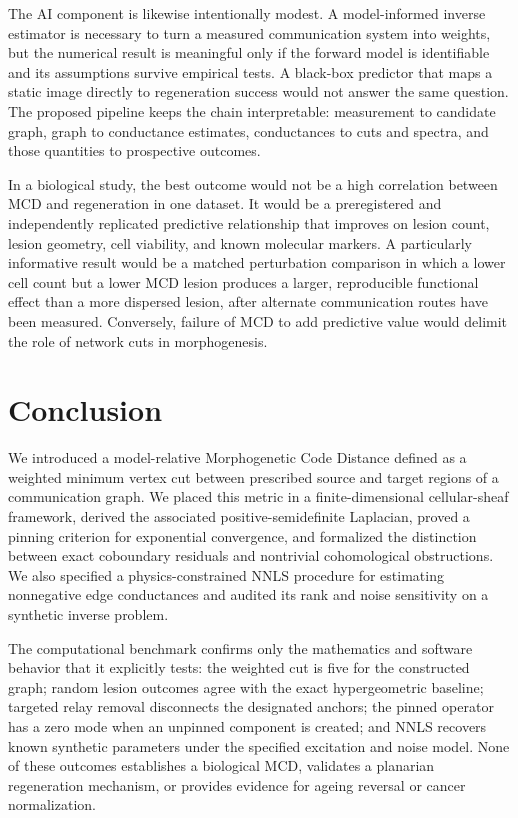 \documentclass[12pt,a4paper]{article}
\begin{document}
The AI component is likewise intentionally modest. A model-informed inverse estimator is necessary to turn a measured communication system into weights, but the numerical result is meaningful only if the forward model is identifiable and its assumptions survive empirical tests. A black-box predictor that maps a static image directly to regeneration success would not answer the same question. The proposed pipeline keeps the chain interpretable: measurement to candidate graph, graph to conductance estimates, conductances to cuts and spectra, and those quantities to prospective outcomes.

In a biological study, the best outcome would not be a high correlation between MCD and regeneration in one dataset. It would be a preregistered and independently replicated predictive relationship that improves on lesion count, lesion geometry, cell viability, and known molecular markers. A particularly informative result would be a matched perturbation comparison in which a lower cell count but a lower MCD lesion produces a larger, reproducible functional effect than a more dispersed lesion, after alternate communication routes have been measured. Conversely, failure of MCD to add predictive value would delimit the role of network cuts in morphogenesis.

\section{Conclusion}
We introduced a model-relative Morphogenetic Code Distance defined as a weighted minimum vertex cut between prescribed source and target regions of a communication graph. We placed this metric in a finite-dimensional cellular-sheaf framework, derived the associated positive-semidefinite Laplacian, proved a pinning criterion for exponential convergence, and formalized the distinction between exact coboundary residuals and nontrivial cohomological obstructions. We also specified a physics-constrained NNLS procedure for estimating nonnegative edge conductances and audited its rank and noise sensitivity on a synthetic inverse problem.

The computational benchmark confirms only the mathematics and software behavior that it explicitly tests: the weighted cut is five for the constructed graph; random lesion outcomes agree with the exact hypergeometric baseline; targeted relay removal disconnects the designated anchors; the pinned operator has a zero mode when an unpinned component is created; and NNLS recovers known synthetic parameters under the specified excitation and noise model. None of these outcomes establishes a biological MCD, validates a planarian regeneration mechanism, or provides evidence for ageing reversal or cancer normalization.
\end{document}
